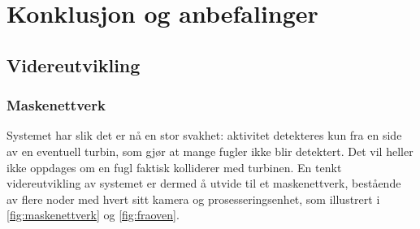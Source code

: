 \section{Konklusjon og anbefalinger}
\label{sec:konklusjon}


\subsection{Videreutvikling}\label{sec:videreutvikling}

\subsubsection{Maskenettverk}\label{sec:videreutvikling:maske}

Systemet har slik det er nå en stor svakhet: aktivitet detekteres kun fra en side av en eventuell turbin, som gjør at mange fugler ikke blir detektert. 
Det vil heller ikke oppdages om en fugl faktisk kolliderer med turbinen. 
En tenkt videreutvikling av systemet er dermed å utvide til et maskenettverk, bestående av flere noder med hvert sitt kamera og prosesseringsenhet, som illustrert i \autoref{fig:maskenettverk} og \ref{fig:fraoven}. 


